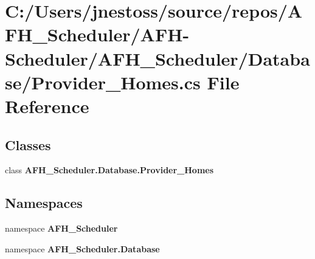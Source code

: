 \section{C\+:/\+Users/jnestoss/source/repos/\+A\+F\+H\+\_\+\+Scheduler/\+A\+F\+H-\/\+Scheduler/\+A\+F\+H\+\_\+\+Scheduler/\+Database/\+Provider\+\_\+\+Homes.cs File Reference}
\label{_provider___homes_8cs}
\subsection*{Classes}
\begin{DoxyCompactItemize}
\item 
class \textbf{ A\+F\+H\+\_\+\+Scheduler.\+Database.\+Provider\+\_\+\+Homes}
\end{DoxyCompactItemize}
\subsection*{Namespaces}
\begin{DoxyCompactItemize}
\item 
namespace \textbf{ A\+F\+H\+\_\+\+Scheduler}
\item 
namespace \textbf{ A\+F\+H\+\_\+\+Scheduler.\+Database}
\end{DoxyCompactItemize}

